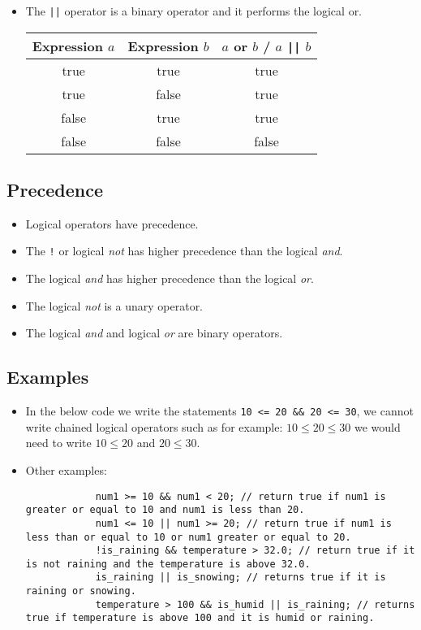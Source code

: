 \begin{itemize}
    \item The \texttt{||} operator is a binary operator and it performs the logical or.
        \begin{center}
            \begin{tabular}{ |c|c|c| }
                \hline
                    Expression $a$ & Expression $b$ & $a$ or $b$ / $a$ \texttt{||} $b$ \\
                \hline
                    true & true & true \\ 
                    true & false & true \\ 
                    false & true & true \\ 
                    false & false & false \\ 
                \hline
            \end{tabular}
        \end{center}
\end{itemize}

\subsection{Precedence}
\begin{itemize}
    \item Logical operators have precedence. 
    \item The \texttt{!} or logical \emph{not} has higher precedence than the logical \emph{and}.
    \item The logical \emph{and} has higher precedence than the logical \emph{or}.
    \item The logical \emph{not} is a unary operator.
    \item The logical \emph{and}  and logical \emph{or} are binary operators.
\end{itemize}

\subsection{Examples}
\begin{itemize}
    \item In the below code we write the statements \texttt{10 <= 20 && 20 <= 30}, we cannot write chained logical operators such as for example: $10 \leq 20 \leq 30$ we would need to write $10 \leq 20$ and $20 \leq 30$.
    \item Other examples: 
        \begin{verbatim}
            num1 >= 10 && num1 < 20; // return true if num1 is greater or equal to 10 and num1 is less than 20.
            num1 <= 10 || num1 >= 20; // return true if num1 is less than or equal to 10 or num1 greater or equal to 20.
            !is_raining && temperature > 32.0; // return true if it is not raining and the temperature is above 32.0.
            is_raining || is_snowing; // returns true if it is raining or snowing.
            temperature > 100 && is_humid || is_raining; // returns true if temperature is above 100 and it is humid or raining.
        \end{verbatim}
\end{itemize}

